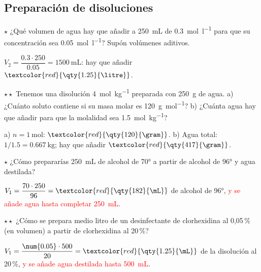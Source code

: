 \subsection{Preparación de disoluciones}

\begin{exercise}
    \(\star\) ¿Qué volumen de agua hay que añadir a \qty{250}{\mL} de  \qty{0.3}{\mol\per\litre} para que su concentración
    sea \qty{0.05}{\mol\per\litre}? Supón volúmenes aditivos.
    \begin{solu}
        \(V_2 = \dfrac{\num{0.3} \cdot 250}{\num{0.05}} = \qty{1500}{\mL}\): hay que añadir \(\textcolor{red}{\qty{1.25}{\litre}}\).
    \end{solu}
\end{exercise}

\begin{exercise}
    \(\star\star\) Tenemos una disolución \qty{4}{\mol\per\kilo\gram} preparada con \qty{250}{\gram} de agua. a) ¿Cuánto soluto
    contiene si su masa molar es \qty{120}{\gram\per\mol}? b) ¿Cuánta agua hay que añadir para que la molalidad sea
    \qty{1.5}{\mol\per\kilo\gram}?
    \begin{solu}
        a) \(n = \qty{1}{\mol}\): \(\textcolor{red}{\qty{120}{\gram}}\). b) Agua total: \(1/\num{1.5} = \qty{0.667}{\kilo\gram}\);
        hay que añadir \(\textcolor{red}{\qty{417}{\gram}}\).
    \end{solu}
\end{exercise}

\begin{exercise}
    \(\star\) ¿Cómo prepararías \qty{250}{\mL} de alcohol de \ang{70} a partir de alcohol de \ang{96} y agua destilada?
    \begin{solu}
        \(V_1 = \dfrac{70 \cdot 250}{96} = \textcolor{red}{\qty{182}{\mL}}\) de alcohol de \ang{96}, \textcolor{red}{y se añade agua
        hasta completar \qty{250}{\mL}}.
    \end{solu}
\end{exercise}

\begin{exercise}
    \(\star\star\) ¿Cómo se prepara medio litro de un desinfectante de clorhexidina al 0,05\,\% (en volumen) a partir de
    clorhexidina al 20\,\%?
    \begin{solu}
        \(V_1 = \dfrac{\num{0.05} \cdot 500}{20} = \textcolor{red}{\qty{1.25}{\mL}}\) de la disolución al 20\,\%, \textcolor{red}{y se
        añade agua destilada hasta \qty{500}{\mL}}.
    \end{solu}
\end{exercise}

